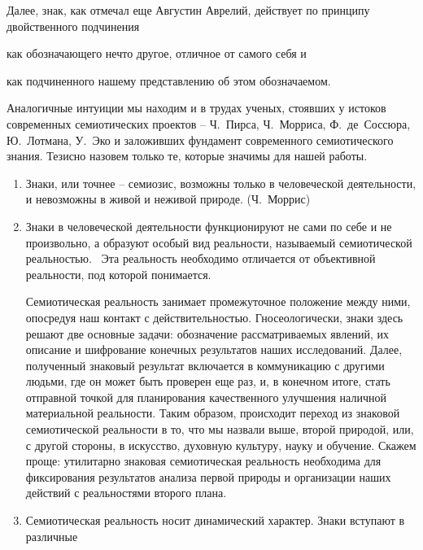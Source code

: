 Далее, знак, как отмечал еще Августин Аврелий, действует по принципу двойственного подчинения \begin{enumerate*}[label=\asbuk*)]
    \item как обозначающего нечто другое, отличное от самого себя и
    \item как подчиненного нашему представлению об этом обозначаемом.~\autocite{gorny}
\end{enumerate*} Аналогичные интуиции мы находим и в трудах ученых, стоявших у истоков современных семиотических проектов -- Ч.~Пирса, Ч.~Морриса, Ф.~де~Соссюра, Ю.~Лотмана, У.~Эко и заложивших фундамент современного семиотического знания. Тезисно назовем только те, которые значимы для нашей работы.
\begin{enumerate}
\item Знаки, или точнее -- семиозис, возможны только в человеческой деятельности, и невозможны в
  живой и неживой природе. (Ч.~Моррис)
\item Знаки в человеческой деятельности функционируют не сами по себе и не произвольно,
  а образуют особый вид реальности, называемый семиотической реальностью.~\autocite{gorny}
  Эта реальность необходимо отличается от объективной реальности, под которой понимается.
  Семиотическая реальность занимает промежуточное положение между ними,
  опосредуя наш контакт с действительностью. Гносеологически, знаки здесь решают две
  основные задачи: обозначение рассматриваемых явлений, их описание и шифрование конечных результатов
  наших исследований. Далее, полученный знаковый результат включается в коммуникацию
  с другими людьми, где он может быть проверен еще раз, и, в конечном итоге, стать отправной
  точкой для планирования качественного улучшения наличной материальной реальности.
  Таким образом, происходит переход из знаковой семиотической реальности в то, что мы назвали выше,
  второй природой, или, с другой стороны, в искусство, духовную культуру, науку и обучение.
  Скажем проще: утилитарно знаковая семиотическая реальность необходима для фиксирования результатов
  анализа первой природы и организации наших действий с реальностями второго плана.
\item Семиотическая реальность носит динамический характер. Знаки вступают в различные

\end{enumerate}
